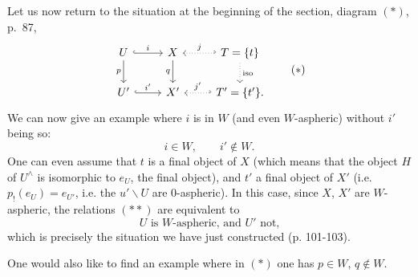 \documentclass[11pt]{article}
\newcommand{\msp}[1]{\marginpar{\footnotesize [#1]}}
\begin{document}
\msp{page 104}
Let us now return to the situation at the beginning of the section, diagram $(*)$, p.~87,
\[
\begin{tikzcd}
U \arrow[r, hook, "i"] \arrow[d, "p"'] & X \arrow[d, "q"'] & T = \{t\} \arrow[l, hook', dotted, "j"'] \arrow[d, dotted, "\mathrm{iso}"] \\
U' \arrow[r, hook, "i'"] & X' & T' = \{t'\}. \arrow[l, hook', dotted, "j'"']
\end{tikzcd}
\tag*{$(*)$}
\]
We can now give an example where $i$ is in $W$ (and even $W$-aspheric) without $i'$ being so:
\[
i \in W, \qquad i' \notin W. \tag*{$(**)$}
\]
One can even assume that $t$ is a final object of $X$ (which means that the object $H$ of $U^\wedge$ is isomorphic to $e_U$, the final object), and $t'$ a final object of $X'$ (i.e. $p_!(e_U) = e_{U'}$, i.e. the $u'\backslash U$ are 0-aspheric). In this case, since $X$, $X'$ are $W$-aspheric, the relations $(**)$ are equivalent to
\[
U \text{ is } W\text{-aspheric, and } U' \text{ not,} \tag*{$(***)$}
\]
which is precisely the situation we have just constructed (p. 101-103).

One would also like to find an example where in $(*)$ one has $p \in W$, $q \notin W$.
\end{document}
